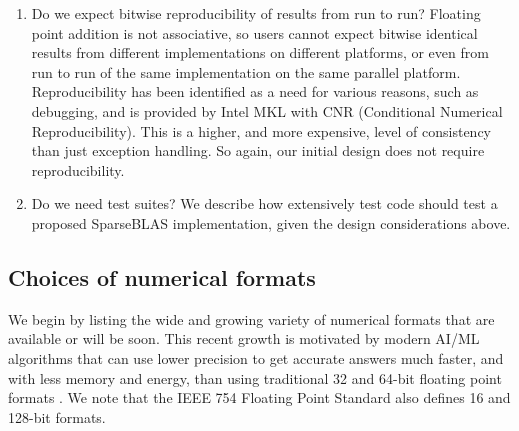\documentclass[manuscript,review]{acmart}
\begin{document}
\begin{enumerate}
optimization.
\item Do we expect bitwise reproducibility of results from run to run?
Floating point addition is not associative, so users
cannot expect bitwise identical results from different
implementations on different platforms, or even from
run to run of the same implementation on the same
parallel platform. Reproducibility has been identified
as a need for various reasons, such as debugging, and is provided
by Intel MKL with CNR (Conditional Numerical
Reproducibility).
This is a higher, and more expensive, 
level of consistency than just exception handling. So again, our initial design
does not require reproducibility.
\item Do we need test suites? We describe how extensively test code
should test a proposed SparseBLAS implementation, given
the design considerations above.
\end{enumerate}

\subsection{Choices of numerical formats}\label{sec:ChoicesNumericalFormats}

We begin by listing the wide and growing variety of
numerical formats that are available or will be soon.
This recent growth is motivated by modern AI/ML algorithms
that can use lower precision to get accurate answers much
faster, and with less memory and energy, than using 
traditional 32 and 64-bit floating point formats \cite{IEEE754}. We note that the IEEE 754 Floating Point Standard \cite{IEEE754} also defines 16 and 128-bit formats.
\end{document}
